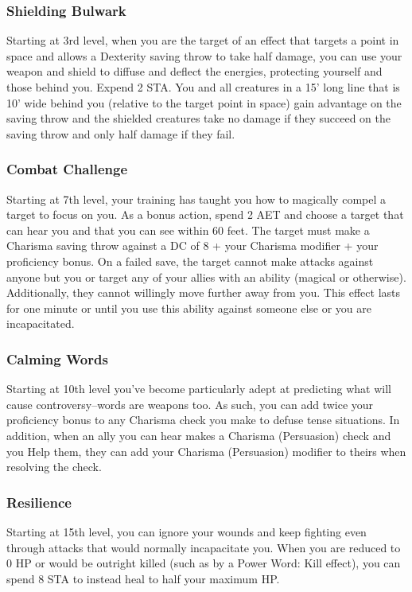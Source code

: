 \subsubsection{Shielding Bulwark}
Starting at 3rd level, when you are the target of an effect that targets a point in space and allows a Dexterity saving throw to take half damage, you can use your weapon and shield to diffuse and deflect the energies, protecting yourself and those behind you. Expend 2 STA. You and all creatures in a 15' long line that is 10' wide behind you (relative to the target point in space) gain advantage on the saving throw and the shielded creatures take no damage if they succeed on the saving throw and only half damage if they fail.

\subsubsection{Combat Challenge}
Starting at 7th level, your training has taught you how to magically compel a target to focus on you. As a bonus action, spend 2 AET and choose a target that can hear you and that you can see within 60 feet. The target must make a Charisma saving throw against a DC of 8 + your Charisma modifier + your proficiency bonus. On a failed save, the target cannot make attacks against anyone but you or target any of your allies with an ability (magical or otherwise). Additionally, they cannot willingly move further away from you. This effect lasts for one minute or until you use this ability against someone else or you are incapacitated.

\subsubsection{Calming Words}
Starting at 10th level you've become particularly adept at predicting what will cause controversy--words are weapons too. As such, you can add twice your proficiency bonus to any Charisma check you make to defuse tense situations. In addition, when an ally you can hear makes a Charisma (Persuasion) check and you Help them, they can add your Charisma (Persuasion) modifier to theirs when resolving the check.

\subsubsection{Resilience}
Starting at 15th level, you can ignore your wounds and keep fighting even through attacks that would normally incapacitate you. When you are reduced to 0 HP or would be outright killed (such as by a Power Word: Kill effect), you can spend 8 STA to instead heal to half your maximum HP.

